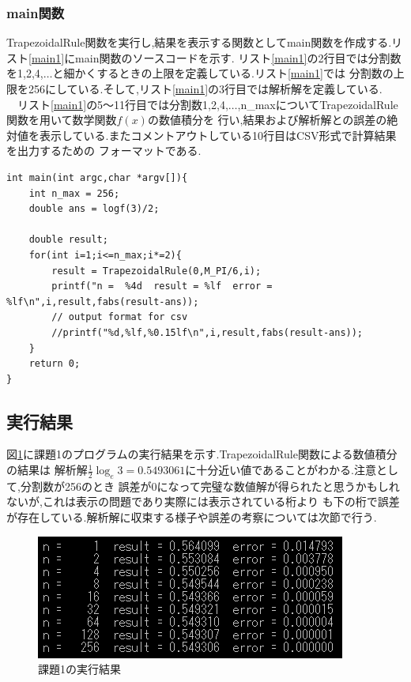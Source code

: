 \documentclass[dvipdfmx]{jarticle}
\begin{document}
    \subsubsection{main関数}
    TrapezoidalRule関数を実行し,結果を表示する関数としてmain関数を作成する.リスト\ref{main1}にmain関数のソースコードを示す.
    リスト\ref{main1}の2行目では分割数を1,2,4,$\dots$と細かくするときの上限を定義している.リスト\ref{main1}では
    分割数の上限を256にしている.そして,リスト\ref{main1}の3行目では解析解を定義している.\\
    　リスト\ref{main1}の5～11行目では分割数1,2,4,$\dots$,n\_maxについてTrapezoidalRule関数を用いて数学関数$f(x)$の数値積分を
    行い,結果および解析解との誤差の絶対値を表示している.またコメントアウトしている10行目はCSV形式で計算結果を出力するための
    フォーマットである.
      \begin{lstlisting}[basicstyle=\ttfamily\footnotesize, frame=single,label=main1,caption=main1関数]
int main(int argc,char *argv[]){
    int n_max = 256;
    double ans = logf(3)/2;

    double result;
    for(int i=1;i<=n_max;i*=2){
        result = TrapezoidalRule(0,M_PI/6,i);
        printf("n =  %4d  result = %lf  error = %lf\n",i,result,fabs(result-ans));
        // output format for csv
        //printf("%d,%lf,%0.15lf\n",i,result,fabs(result-ans));
    }
    return 0;
}
            \end{lstlisting}

    \subsection{実行結果}
    図\ref{result1}に課題1のプログラムの実行結果を示す.TrapezoidalRule関数による数値積分の結果は
    解析解$\frac{1}{2} \log_{e} 3 = 0.5493061$に十分近い値であることがわかる.注意として,分割数が256のとき
    誤差が0になって完璧な数値解が得られたと思うかもしれないが,これは表示の問題であり実際には表示されている桁より
    も下の桁で誤差が存在している.解析解に収束する様子や誤差の考察については次節で行う.
    
    \begin{figure}[H]
      \centering
      \includegraphics[scale=0.9]{kadai1.png}
      \caption{課題1の実行結果}
       \label{result1}
      \end{figure}
\end{document}
